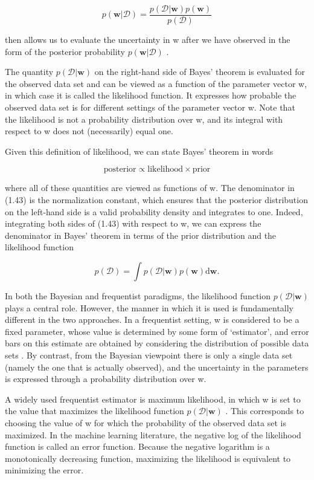 \documentclass[
  10
]{article}
\begin{document}
\[
p (\mathbf {w} | \mathcal {D}) = \frac {p (\mathcal {D} | \mathbf {w}) p (\mathbf {w})}{p (\mathcal {D})}\tag{1.43}
\]

then allows us to evaluate the uncertainty in w after we have observed
in the form of the posterior probability
\(p ( \mathbf { w } | \mathcal { D } )\) .

The quantity \(p ( \mathcal { D } | \mathbf { w } )\) on the right-hand
side of Bayes' theorem is evaluated for the observed data set and can be
viewed as a function of the parameter vector w, in which case it is
called the likelihood function. It expresses how probable the observed
data set is for different settings of the parameter vector w. Note that
the likelihood is not a probability distribution over w, and its
integral with respect to w does not (necessarily) equal one.

Given this definition of likelihood, we can state Bayes' theorem in
words

\[
\mathrm{posterior} \propto \mathrm{likelihood} \times \mathrm{prior}\tag{1.44}
\]

where all of these quantities are viewed as functions of w. The
denominator in (1.43) is the normalization constant, which ensures that
the posterior distribution on the left-hand side is a valid probability
density and integrates to one. Indeed, integrating both sides of (1.43)
with respect to w, we can express the denominator in Bayes' theorem in
terms of the prior distribution and the likelihood function

\[
p (\mathcal {D}) = \int p (\mathcal {D} | \mathbf {w}) p (\mathbf {w}) \mathrm{d} \mathbf {w}.\tag{1.45}
\]

In both the Bayesian and frequentist paradigms, the likelihood function
\(p ( \mathcal { D } | \mathbf { w } )\) plays a central role. However,
the manner in which it is used is fundamentally different in the two
approaches. In a frequentist setting, w is considered to be a fixed
parameter, whose value is determined by some form of `estimator', and
error bars on this estimate are obtained by considering the distribution
of possible data sets . By contrast, from the Bayesian viewpoint there
is only a single data set (namely the one that is actually observed),
and the uncertainty in the parameters is expressed through a probability
distribution over w.

A widely used frequentist estimator is maximum likelihood, in which w is
set to the value that maximizes the likelihood function
\(p ( \mathcal { D } | \mathbf { w } )\) . This corresponds to choosing
the value of w for which the probability of the observed data set is
maximized. In the machine learning literature, the negative log of the
likelihood function is called an error function. Because the negative
logarithm is a monotonically decreasing function, maximizing the
likelihood is equivalent to minimizing the error.
\end{document}
